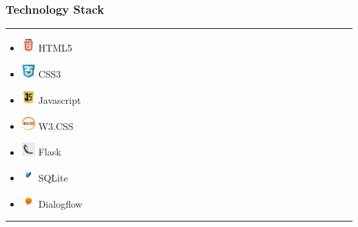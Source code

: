 \documentclass[14pt]{beamer}
\begin{document}
\begin{frame}
    \frametitle{Technology Stack}
    \noindent
    {\color{pink} \rule{\linewidth}{0.7mm} }
    \begin{itemize}
        \item [] \includegraphics[width=0.2in, height=0.2in]{./logos/html.png} HTML5 \\
            \pause
        \item [] \includegraphics[width=0.2in, height=0.2in]{./logos/css.png} CSS3 \\
            \pause
        \item [] \includegraphics[width=0.2in, height=0.2in]{./logos/java.png} Javascript \\
            \pause
        \item [] \includegraphics[width=0.2in, height=0.2in]{./logos/w3.png} W3.CSS \\
            \pause
        \item [] \includegraphics[width=0.2in, height=0.2in]{./logos/flask.jpg} Flask \\
            \pause
        \item [] \includegraphics[width=0.2in, height=0.2in]{./logos/sqllite.png} SQLite \\
            \pause
        \item [] \includegraphics[width=0.2in, height=0.2in]{./logos/dialogflow.jpg} Dialogflow \\
    \end{itemize}
\noindent
    {\color{pink} \rule{\linewidth}{0.7mm} }
\end{frame}
\end{document}
